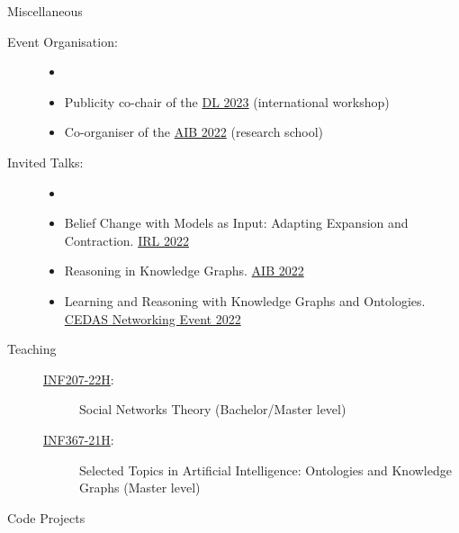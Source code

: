 %

\begin{rSection}{Miscellaneous}
    \begin{description}
        \item[Event Organisation:] {
            \begin{itemize}
                \item[]
                \item Publicity co-chair of the \href{https://dl2023.w.uib.no/}{DL 2023} (international workshop)
                \item Co-organiser of the \href{https://researchschool.w.uib.no/}{AIB 2022} (research school) 
            \end{itemize}
        }
        \item[Invited Talks:]{
            \begin{itemize}
                \item[]
                \item Belief Change with Models as Input: Adapting Expansion and Contraction. \href{https://web.archive.org/web/20221205091252/https://irl.w.uib.no/}{IRL 2022}
                \item Reasoning in Knowledge Graphs. \href{https://researchschool.w.uib.no/}{AIB 2022}
                \item Learning and Reasoning with Knowledge Graphs and Ontologies. \href{https://web.archive.org/web/20221022003238/http://www.uib.no/en/cedas/154942/cedas-networking-event-2022#}{CEDAS Networking Event 2022}
            \end{itemize}
        }
        \item[Teaching]{
            \begin{description}
                \item[]
                \item[\href{https://web.archive.org/web/20220707214216/https://www.uib.no/en/course/INF207#}{INF207-22H}:] Social Networks Theory (Bachelor/Master level)
                \item[\href{https://web.archive.org/web/20210918132515/https://www.uib.no/en/course/INF367#}{INF367-21H}:] Selected Topics in Artificial Intelligence: Ontologies and Knowledge Graphs (Master level)
            \end{description}
        }
        \item[Code Projects]{
            \begin{description}

\end{description}}
\end{description}
\end{rSection}
